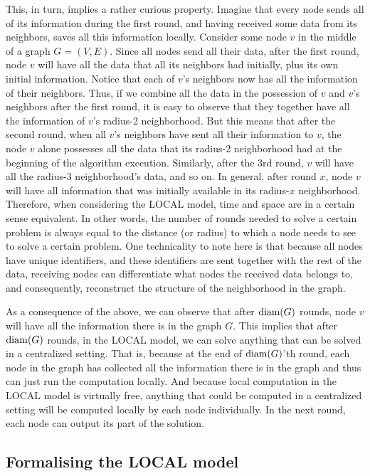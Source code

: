 This, in turn, implies a rather
curious property. Imagine that every node sends all of its information during the first round,
and having received some data from its neighbors, saves all this information locally. Consider
some node $v$ in the middle of a graph $G = (V, E)$. Since all nodes send all their data,
after the first round, node $v$
will have all the data that all its neighbors had initially, plus its own initial information.
Notice that each of $v$'s neighbors now has all the information of their neighbors. Thus,
if we combine all the data in the possession of $v$ and $v$'s neighbors after the first round, it
is easy to observe that they together have all the information of $v$'s radius-2 neighborhood.
But this means that after the second round, when all $v$'s neighbors have sent all their
information to $v$, the node $v$ alone possesses all the data that its radius-2 neighborhood had at the
beginning of the algorithm execution. Similarly, after the 3rd round, $v$ will have all the
radius-3 neighborhood's data, and so on.
In general, after round $x$, node $v$ will have
all information that was initially available in its radius-$x$ neighborhood.
Therefore, when considering the LOCAL model,
time and space are in a certain sense equivalent. In other words, the number of rounds
needed to solve a certain problem is always equal to the distance (or radius) to which a node needs to
see to solve a certain problem. One technicality to note here is that because all nodes have
unique identifiers, and these identifiers are sent together with the rest of the data,
receiving nodes can differentiate what nodes the received data belongs to, and consequently,
reconstruct the structure of the neighborhood in the graph.

As a consequence of the above,
we can observe that after $\operatorname{diam}(G)$ rounds, node $v$ will have all the information there is in the 
graph $G$. This implies that after $\operatorname{diam}(G)$ rounds, in the LOCAL model, we can solve anything that can
be solved in a centralized setting. That is, because at the end of $\operatorname{diam}(G)$'th round, each node in the
graph has collected all the information there is in the graph and thus can just run the
computation locally. And because local computation in the LOCAL model is virtually free,
anything that could be computed in a centralized setting will be computed locally by each
node individually. In the next round, each node can output its part of the solution.

\subsection{Formalising the LOCAL model}

